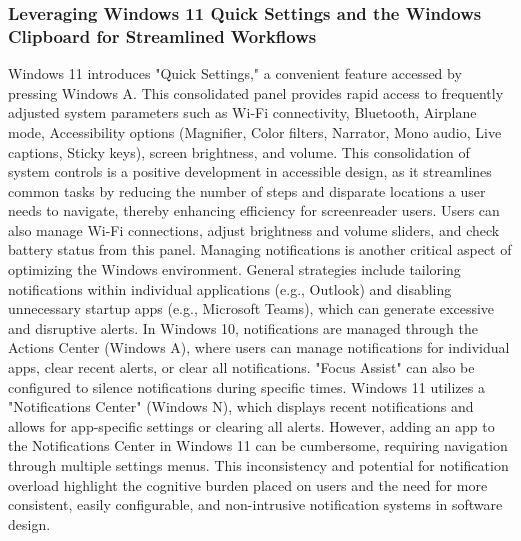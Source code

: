 \subsubsection{Leveraging Windows 11 Quick Settings and the Windows Clipboard for Streamlined Workflows}
Windows 11 introduces "Quick Settings," a convenient feature accessed by pressing Windows A. This consolidated panel provides rapid access to frequently adjusted system parameters such as Wi-Fi connectivity, Bluetooth, Airplane mode, Accessibility options (Magnifier, Color filters, Narrator, Mono audio, Live captions, Sticky keys), screen brightness, and volume.\supercite{kingsbury2025} This consolidation of system controls is a positive development in accessible design, as it streamlines common tasks by reducing the number of steps and disparate locations a user needs to navigate, thereby enhancing efficiency for screenreader users. Users can also manage Wi-Fi connections, adjust brightness and volume sliders, and check battery status from this panel.\supercite{kingsbury2025}
Managing notifications is another critical aspect of optimizing the Windows environment. General strategies include tailoring notifications within individual applications (e.g., Outlook) and disabling unnecessary startup apps (e.g., Microsoft Teams), which can generate excessive and disruptive alerts.\supercite{kingsbury2025} In Windows 10, notifications are managed through the Actions Center (Windows A), where users can manage notifications for individual apps, clear recent alerts, or clear all notifications. "Focus Assist" can also be configured to silence notifications during specific times.\supercite{kingsbury2025} Windows 11 utilizes a "Notifications Center" (Windows N), which displays recent notifications and allows for app-specific settings or clearing all alerts.\supercite{kingsbury2025} However, adding an app to the Notifications Center in Windows 11 can be cumbersome, requiring navigation through multiple settings menus.\supercite{kingsbury2025} This inconsistency and potential for notification overload highlight the cognitive burden placed on users and the need for more consistent, easily configurable, and non-intrusive notification systems in software design.
